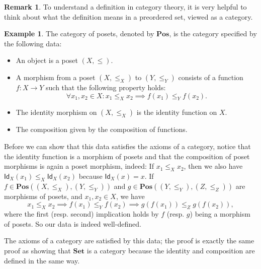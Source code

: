 \documentclass[a4paper,11pt, oneside,titlepage=false]{scrbook}
\theoremstyle{plain}
\theoremstyle{definition}
\newtheorem{rem}[thm]{Remark}
\newtheorem{que}[thm]{Question}
\newtheorem{exa}[thm]{Example}
\newtheorem{exer}[thm]{Exercise}
\newcommand{\cfont}[1]{\ensuremath{\mathsf{#1}}}
\newcommand{\Catb}[1]{\mathbf{#1}}
\newcommand{\SET}{\Catb{Set}}
\newcommand{\POS}{\Catb{Pos}}
\newcommand{\CHom}[3]{{#1}(#2,#3)}
\newcommand{\Id}[1][]{\cfont{Id}_{#1}}
\begin{document}
\begin{rem}
  To understand a definition in category theory, it is very helpful to think about what the definition means in a preordered set, viewed as a category. 
\end{rem}

\begin{exa}\label{example:poset} The category of posets, denoted by $\POS$, is the category specified by the following data:
\begin{itemize}
\item An object is a poset $(X,\leq)$.
\item A morphism from a poset $(X,\leq_X)$ to $(Y,\leq_Y)$ consists of a function $f:X\to Y$ such that the following property holds:
\[
\forall x_1, x_2 \in X: x_1\leq_X x_2 \implies f(x_1)\leq_Y f(x_2).
\]
\item The identity morphism on $(X,\leq_X)$ is the identity function on $X$.
\item The composition given by the composition of functions.
\end{itemize}

Before we can show that this data satisfies the axioms of a category, notice that the identity function is a morphism of posets and that the composition of poset morphisms is again a poset morphism, indeed: If $x_1\leq_X x_2$, then we also have $\Id[X](x_1) \leq_X \Id[X](x_2)$ because $\Id[X](x) = x$. If $f\in\CHom{\POS}{(X,\leq_X)}{(Y,\leq_Y)}$ and $g\in\CHom{\POS}{(Y,\leq_Y)} {(Z,\leq_Z)}$ are morphisms of posets, and $x_1,x_2\in X$, we have 
\[
  x_1\leq_X x_2 \implies f(x_1)\leq_Y f(x_2) \implies g(f(x_1))\leq_Z g(f(x_2)),
\]
where the first (resp. second) implication holds by $f$ (resp. $g$) being a morphism of posets. So our data is indeed well-defined.

The axioms of a category are satisfied by this data; the proof is exactly the same proof as showing that $\SET$ is a category because the identity and composition are defined in the same way.
\end{exa}


\end{document}
